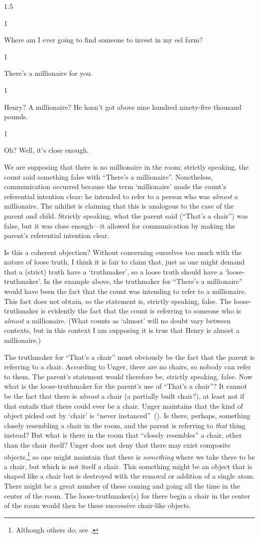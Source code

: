 \documentclass[11pt]{standalone} \newif\ifstandlone \standalonetrue
\newcommand{\stage}[3]%
{%
	\begin{spacing}{1}%
	\vspace{0pt}
		\begin{description}[style=nextline, parsep=0pt,
                    leftmargin=15mm, itemindent=-10mm, font=\mdseries]
			\item[\textsc{#1} \emph{#2}] #3
		\end{description}%
	\end{spacing}%
}
\begin{document}
\begin{spacing}{1.5}
\stage{Countess}{}{Where am I ever going to find someone to invest in
  my eel farm?}

\stage{Count}{(pointing)}{There's a millionaire for you.}

\stage{Countess}{(incredulous)}{Henry?  A millionaire?  He hasn't got
  above nine hundred ninety-five thousand pounds.}

\stage{Count}{}{Oh?  Well, it's close enough.}

We are supposing that there is no millionaire in the room; strictly
speaking, the count said something false with ``There's a
millionaire''.  Nonetheless, communication occurred because the term
`millionaire' made the count's referential intention clear: he
intended to refer to a person who was {\em almost} a millionaire.  The
nihilist is claiming that this is analogous to the case of the parent
and child.  Strictly speaking, what the parent said (``That's a
chair'') was false, but it was close enough---it allowed for
communication by making the parent's referential intention clear.

Is this a coherent objection?  Without concerning ourselves too much
with the nature of loose truth, I think it is fair to claim that, just
as one might demand that a (strict) truth have a `truthmaker', so a
loose truth should have a `loose-truthmaker'.  In the example above,
the truthmaker for ``There's a millionaire'' would have been the fact
that the count was intending to refer to a millionaire.  This fact
does not obtain, so the statement is, strictly speaking, false.  The
loose-truthmaker is evidently the fact that the count is referring to
someone who is {\em almost} a millionaire.  (What counts as `almost'
will no doubt vary between contexts, but in this context I am
supposing it is true that Henry is almost a millionaire.)

The truthmaker for ``That's a chair'' must obviously be the fact that
the parent is referring to a chair.  According to Unger, there are no
chairs, so nobody can refer to them.  The parent's statement would
therefore be, strictly speaking, false.  Now what is the
loose-truthmaker for the parent's use of ``That's a chair''?  It
cannot be the fact that there is {\em almost} a chair (a partially
built chair?), at least not if that entails that there could ever be a
chair.  Unger maintains that the kind of object picked out by `chair'
is ``never instanced''~(\citeyear[147]{unger1979}).  Is there,
perhaps, something closely resembling a chair in the room, and the
parent is referring to {\em that} thing instead?  But what is there in
the room that ``closely resembles'' a chair, other than the chair
itself?  Unger does not deny that there may exist composite
objects,\footnote{Although others do; see \citep{sider2011c}.} so one
might maintain that there is \emph{something} where we take there to
be a chair, but which is not itself a chair.  This something might be
an object that is shaped like a chair but is destroyed with the
removal or addition of a single atom.  There might be a great number
of these coming and going all the time in the center of the room.  The
loose-truthmaker(s) for there begin a chair in the center of the room
would then be these successive chair-like objects.


\end{spacing}
\end{document}
